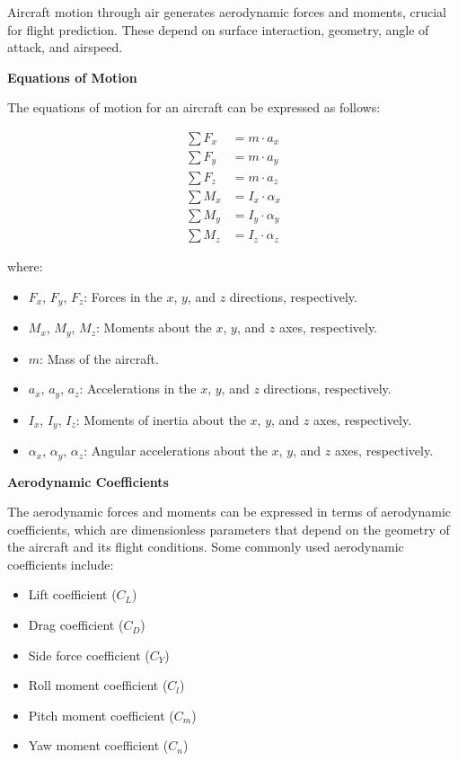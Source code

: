 Aircraft motion through air generates aerodynamic forces and moments, crucial for flight prediction. These depend on surface interaction, geometry, angle of attack, and airspeed.

\textbf{Equations of Motion}

The equations of motion for an aircraft can be expressed as follows:

\begin{align}
    \sum F_x &= m \cdot a_x \\
    \sum F_y &= m \cdot a_y \\
    \sum F_z &= m \cdot a_z \\
    \sum M_x &= I_x \cdot \alpha_x \\
    \sum M_y &= I_y \cdot \alpha_y \\
    \sum M_z &= I_z \cdot \alpha_z
\end{align}

where:
\begin{itemize}
    \item $F_x$, $F_y$, $F_z$: Forces in the $x$, $y$, and $z$ directions, respectively.
    \item $M_x$, $M_y$, $M_z$: Moments about the $x$, $y$, and $z$ axes, respectively.
    \item $m$: Mass of the aircraft.
    \item $a_x$, $a_y$, $a_z$: Accelerations in the $x$, $y$, and $z$ directions, respectively.
    \item $I_x$, $I_y$, $I_z$: Moments of inertia about the $x$, $y$, and $z$ axes, respectively.
    \item $\alpha_x$, $\alpha_y$, $\alpha_z$: Angular accelerations about the $x$, $y$, and $z$ axes, respectively.
\end{itemize}

\textbf{Aerodynamic Coefficients}

The aerodynamic forces and moments can be expressed in terms of aerodynamic coefficients, which are dimensionless parameters that depend on the geometry of the aircraft and its flight conditions. Some commonly used aerodynamic coefficients include:

\begin{itemize}
    \item Lift coefficient ($C_L$)
    \item Drag coefficient ($C_D$)
    \item Side force coefficient ($C_Y$)
    \item Roll moment coefficient ($C_l$)
    \item Pitch moment coefficient ($C_m$)
    \item Yaw moment coefficient ($C_n$)
\end{itemize}

